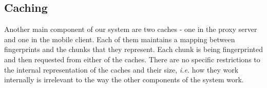 \subsection{Caching}
\label{sec:caching}
Another main component of our system are two caches - one in the proxy server and one in the 
mobile client. Each of them maintains a mapping between fingerprints and the chunks that they
represent. Each chunk is being fingerprinted and then requested from either of the caches. There
are no specific restrictions to the internal representation of the caches and their size, \textit{i.e.}
how they work internally is irrelevant to the way the other components of the system work.
